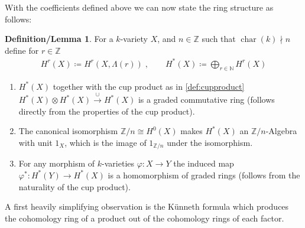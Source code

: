 \documentclass[english]{scrartcl}
\theoremstyle{definition}
\newtheorem{DefLem}[Def]{Definition/Lemma}
\theoremstyle{remark}
\newcommand*{\N}{\mathds{N}}
\newcommand*{\Z}{\mathds{Z}}
\newcommand*{\Zmod}[1]{\Z/#1} %
\DeclareMathOperator{\Char}{char} %
\renewcommand*{\phi}{\varphi}
\begin{document}
With the coefficients defined above we can now state the ring
structure
as follows:
\begin{DefLem}
  For a $k$-variety $X$, and $n\in\Z$ such that $\Char(k)\nmid n$
  define for $r\in\Z$
  \begin{align*}
    H^r(X) \coloneqq H^r(X,\Lambda(r))\;,\qquad
    H^*(X) \coloneqq \bigoplus_{r\in\N}H^r(X)
  \end{align*}
  \begin{enumerate}
  \item $H^*(X)$ together with the cup product as in \ref{def:cupproduct}
    $H^*(X)\otimes H^*(X)\xrightarrow{\cup} H^*(X)$
    is a graded commutative ring
    (follows directly from the properties of the cup product).
  \item The canonical isomorphism $\Zmod{n}\cong H^0(X)$ makes
    $H^*(X)$ an $\Zmod{n}$-Algebra with unit $1_X$,
    which is the image of $1_{\Zmod{n}}$ under the isomorphism.
  \item For any morphism of $k$-varieties $\phi\colon X\to Y$ the
    induced map $\phi^*\colon H^*(Y)\to H^*(X)$ is a homomorphism of
    graded rings
    (follows from the naturality of the cup product).
  \end{enumerate}
\end{DefLem}

A first heavily simplifying observation is the Künneth formula which
produces the cohomology ring of a product out of the cohomology rings
of each factor.
\end{document}
